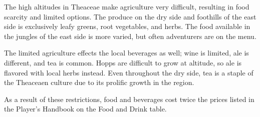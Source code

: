 The high altitudes in Theaceae make agriculture very difficult, resulting in food scarcity and limited options.
The produce on the dry side and foothills of the east side is exclusively leafy greens, root vegetables, and herbs.
The food available in the jungles of the east side is more varied, but often adventurers are on the menu.

The limited agriculture effects the local beverages as well; wine is limited, ale is different, and tea is common.
Hopps are difficult to grow at altitude, so ale is flavored with local herbs instead.
Even throughout the dry side, tea is a staple of the Theaceaen culture due to its prolific growth in the region.

As a result of these restrictions, food and beverages cost twice the prices listed in the Player's Handbook on the Food and Drink table.
